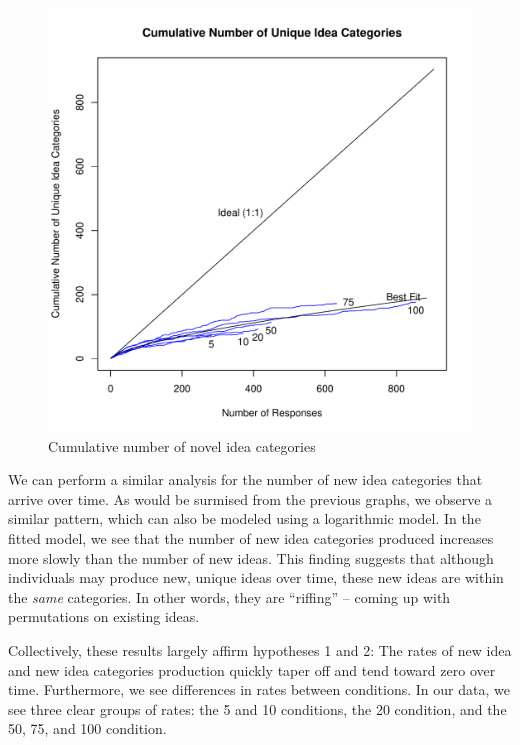 \begin{figure}[h!]
    \centering
    \includegraphics[width=0.9\columnwidth]{cumulative_categories}
    \caption{Cumulative number of novel idea categories}
\end{figure}


We can perform a similar analysis for the number of new idea categories that arrive over time. As would be surmised from the previous graphs, we observe a similar pattern, which can also be modeled using a logarithmic model. In the fitted model, we see that the number of new idea categories produced increases more slowly than the number of new ideas. This finding suggests that although individuals may produce new, unique ideas over time, these new ideas are within the \emph{same} categories. In other words, they are ``riffing'' -- coming up with permutations on existing ideas.

Collectively, these results largely affirm hypotheses 1 and 2: The rates of new idea and new idea categories production quickly taper off and tend toward zero over time. Furthermore, we see differences in rates between conditions. In our data, we see three clear groups of rates: the 5 and 10 conditions, the 20 condition, and the 50, 75, and 100 condition.

